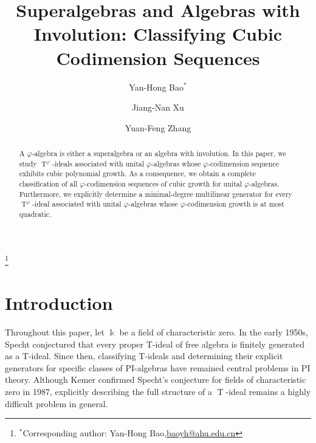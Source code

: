 \documentclass{amsart}
\theoremstyle{definition}
\theoremstyle{remark}
\numberwithin{equation}{section}
\def \vp{\varphi}
\def \k{\Bbbk}
\def \T{\operatorname{T}}
\begin{document}
	
\title{Superalgebras and Algebras with Involution: Classifying Cubic Codimension Sequences}
	
\author{Yan-Hong Bao$^*$}
\address{(Bao) School of Mathematical Sciences, Anhui University, Hefei 230601, China}
\thanks{$^*$Corresponding author: Yan-Hong Bao,\href{mailto:baoyh@ahu.edu.cn}{baoyh@ahu.edu.cn}}
	
\author{Jiang-Nan Xu}
\address{(Xu) School of Finance and Mathematics, Huainan Normal University, Huainan 232038, China}
	
\author{Yuan-Feng Zhang}
\address{(Zhang)  School of Mathematical Sciences, Anhui University, Hefei 230601, China}
	
	
	
	
	
	
\begin{abstract} 
	A $\vp$-algebra is either a superalgebra or an algebra with involution. In this paper, we study $\T^\vp$-ideals associated with unital $\vp$-algebras whose $\vp$-codimension sequence exhibits cubic polynomial growth. As a consequence, we obtain a complete classification of all $\vp$-codimension sequences of cubic growth for unital $\vp$-algebras. Furthermore, we explicitly determine a minimal-degree multilinear generator for every $\T^\vp$-ideal associated with unital $\vp$-algebras whose $\vp$-codimension growth is at most quadratic.
\end{abstract}
	
\maketitle
\setcounter{section}{-1}

\section{Introduction} \label{sec0} 
	Throughout this paper, let $\k$ be a field of characteristic zero. In the early 1950s, Specht \cite{Sp}  conjectured that every proper T-ideal of free algebra is finitely generated as a T-ideal. Since then, classifying T-ideals and determining their explicit generators for specific classes of PI-algebras have remained central problems in PI theory. Although Kemer \cite{Ke87} confirmed Specht's conjecture for fields of characteristic zero in 1987, explicitly describing the full structure of a $\T$-ideal remains a highly difficult problem in general.
	
\end{document}
